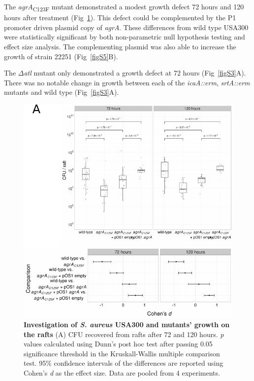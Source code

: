 \documentclass[10pt,letterpaper]{article}
\begin{document}
The \textit{agrA}\textsubscript{C123F} mutant demonstrated a modest growth defect 72 hours and 120 hours after treatment (Fig~\ref{fig3}).
This defect could be complemented by the P1 promoter driven plasmid copy of \textit{agrA}.
These differences from wild type USA300 were statistically significant by both non-parametric null hypothesis testing and effect size analysis.
The complementing plasmid was also able to increase the growth of strain 22251 (Fig~\ref{figS5}B). 

The $\Delta$\textit{atl} mutant only demonstrated a growth defect at 72 hours (Fig~\ref{figS3}A).
There was no notable change in growth between each of the \textit{icaA::erm}, 
\textit{srtA::erm} mutants and wild type (Fig~\ref{figS3}A).


\begin{figure}[!ht]
\begin{adjustwidth}{-2.25in}{0in}
\includegraphics[width=0.85\paperwidth]{Figures/fig3.pdf}
\caption[Investigation of \textit{S. aureus} USA300 and mutants' growth on the rafts]{
	\textbf{Investigation of \textit{S. aureus} USA300 and mutants' growth on the rafts}
	(A) CFU recovered from rafts after 72 and 120 hours. \textit{p} values calculated using Dunn's post hoc test after passing 0.05 significance threshold in the Kruskall-Wallis multiple comparison test. 95\% confidence intervals of the differences are reported using Cohen's \textit{d} as the effect size. Data are pooled from 4 experiments.}
	\label{fig3}
    \end{adjustwidth}
\end{figure}
\end{document}
